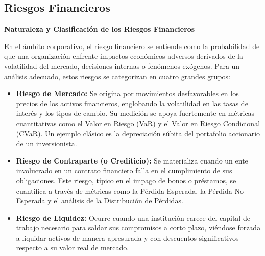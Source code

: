 \subsection{Riesgos Financieros}


\textbf{Naturaleza y Clasificación de los Riesgos Financieros}

\noindent En el ámbito corporativo, el riesgo financiero se entiende como la probabilidad de que una organización enfrente impactos económicos adversos derivados de la volatilidad del mercado, decisiones internas o fenómenos exógenos. Para un análisis adecuado, estos riesgos se categorizan en cuatro grandes grupos:

\vspace{0.3cm}
\begin{itemize}[label=\textcolor{azulp}{\textbullet}, leftmargin=0.8cm]
    \item \textbf{Riesgo de Mercado:} Se origina por movimientos desfavorables en los precios de los activos financieros, englobando la volatilidad en las tasas de interés y los tipos de cambio. Su medición se apoya fuertemente en métricas cuantitativas como el Valor en Riesgo (VaR) y el Valor en Riesgo Condicional (CVaR). Un ejemplo clásico es la depreciación súbita del portafolio accionario de un inversionista.
    
    \item \textbf{Riesgo de Contraparte (o Crediticio):} Se materializa cuando un ente involucrado en un contrato financiero falla en el cumplimiento de sus obligaciones. Este riesgo, típico en el impago de bonos o préstamos, se cuantifica a través de métricas como la Pérdida Esperada, la Pérdida No Esperada y el análisis de la Distribución de Pérdidas.
    
    \item \textbf{Riesgo de Liquidez:} Ocurre cuando una institución carece del capital de trabajo necesario para saldar sus compromisos a corto plazo, viéndose forzada a liquidar activos de manera apresurada y con descuentos significativos respecto a su valor real de mercado.
    

\end{itemize}
